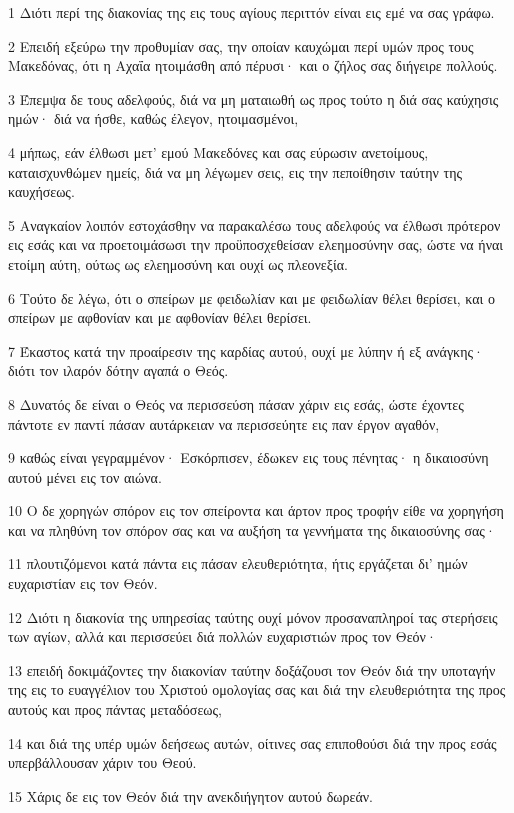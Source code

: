 \par 1 Διότι περί της διακονίας της εις τους αγίους περιττόν είναι εις εμέ να σας γράφω.
\par 2 Επειδή εξεύρω την προθυμίαν σας, την οποίαν καυχώμαι περί υμών προς τους Μακεδόνας, ότι η Αχαΐα ητοιμάσθη από πέρυσι· και ο ζήλος σας διήγειρε πολλούς.
\par 3 Έπεμψα δε τους αδελφούς, διά να μη ματαιωθή ως προς τούτο η διά σας καύχησις ημών· διά να ήσθε, καθώς έλεγον, ητοιμασμένοι,
\par 4 μήπως, εάν έλθωσι μετ' εμού Μακεδόνες και σας εύρωσιν ανετοίμους, καταισχυνθώμεν ημείς, διά να μη λέγωμεν σεις, εις την πεποίθησιν ταύτην της καυχήσεως.
\par 5 Αναγκαίον λοιπόν εστοχάσθην να παρακαλέσω τους αδελφούς να έλθωσι πρότερον εις εσάς και να προετοιμάσωσι την προϋποσχεθείσαν ελεημοσύνην σας, ώστε να ήναι ετοίμη αύτη, ούτως ως ελεημοσύνη και ουχί ως πλεονεξία.
\par 6 Τούτο δε λέγω, ότι ο σπείρων με φειδωλίαν και με φειδωλίαν θέλει θερίσει, και ο σπείρων με αφθονίαν και με αφθονίαν θέλει θερίσει.
\par 7 Έκαστος κατά την προαίρεσιν της καρδίας αυτού, ουχί με λύπην ή εξ ανάγκης· διότι τον ιλαρόν δότην αγαπά ο Θεός.
\par 8 Δυνατός δε είναι ο Θεός να περισσεύση πάσαν χάριν εις εσάς, ώστε έχοντες πάντοτε εν παντί πάσαν αυτάρκειαν να περισσεύητε εις παν έργον αγαθόν,
\par 9 καθώς είναι γεγραμμένον· Εσκόρπισεν, έδωκεν εις τους πένητας· η δικαιοσύνη αυτού μένει εις τον αιώνα.
\par 10 Ο δε χορηγών σπόρον εις τον σπείροντα και άρτον προς τροφήν είθε να χορηγήση και να πληθύνη τον σπόρον σας και να αυξήση τα γεννήματα της δικαιοσύνης σας·
\par 11 πλουτιζόμενοι κατά πάντα εις πάσαν ελευθεριότητα, ήτις εργάζεται δι' ημών ευχαριστίαν εις τον Θεόν.
\par 12 Διότι η διακονία της υπηρεσίας ταύτης ουχί μόνον προσαναπληροί τας στερήσεις των αγίων, αλλά και περισσεύει διά πολλών ευχαριστιών προς τον Θεόν·
\par 13 επειδή δοκιμάζοντες την διακονίαν ταύτην δοξάζουσι τον Θεόν διά την υποταγήν της εις το ευαγγέλιον του Χριστού ομολογίας σας και διά την ελευθεριότητα της προς αυτούς και προς πάντας μεταδόσεως,
\par 14 και διά της υπέρ υμών δεήσεως αυτών, οίτινες σας επιποθούσι διά την προς εσάς υπερβάλλουσαν χάριν του Θεού.
\par 15 Χάρις δε εις τον Θεόν διά την ανεκδιήγητον αυτού δωρεάν.

